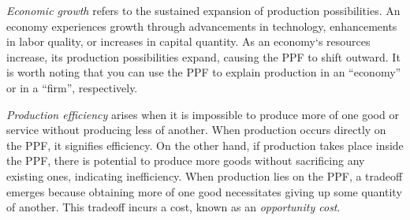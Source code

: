 \documentclass[
  12pt,
  oneside]{book}
\theoremstyle{definition}
\theoremstyle{definition}
\theoremstyle{definition}
\theoremstyle{definition}
\theoremstyle{remark}
\begin{document}
\emph{Economic growth} refers to the sustained expansion of production possibilities. An economy experiences growth through advancements in technology, enhancements in labor quality, or increases in capital quantity. As an economy`s resources increase, its production possibilities expand, causing the PPF to shift outward. It is worth noting that you can use the PPF to explain production in an ``economy'' or in a ``firm'', respectively.

\emph{Production efficiency} arises when it is impossible to produce more of one good or service without producing less of another. When production occurs directly on the PPF, it signifies efficiency. On the other hand, if production takes place inside the PPF, there is potential to produce more goods without sacrificing any existing ones, indicating inefficiency. When production lies on the PPF, a tradeoff emerges because obtaining more of one good necessitates giving up some quantity of another. This tradeoff incurs a cost, known as an \emph{opportunity cost}.
\end{document}
